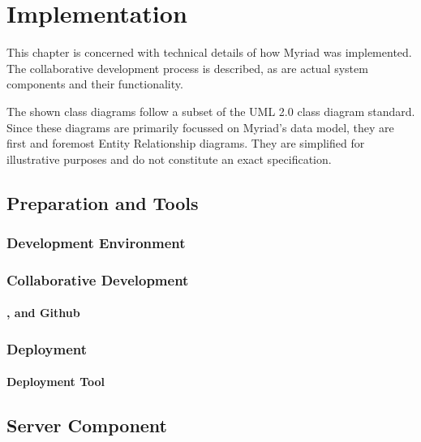 \chapter{Implementation}
\label{chapter:Implementation}

This chapter is concerned with technical details of how Myriad was implemented. The collaborative development process is described, as are actual system components and their functionality.

The shown class diagrams follow a subset of the UML 2.0 class diagram standard\cite{uml}. Since these diagrams are primarily focussed on Myriad's data model, they are first and foremost Entity Relationship diagrams. They are simplified for illustrative purposes and do not constitute an exact specification.

\section{Preparation and Tools}



\subsection{Development Environment}



\subsection{Collaborative Development}



\subsubsection{,  and Github}



\subsection{Deployment}
\label{subsection:Deployment}



\subsubsection{Deployment Tool }




\section{Server Component}


